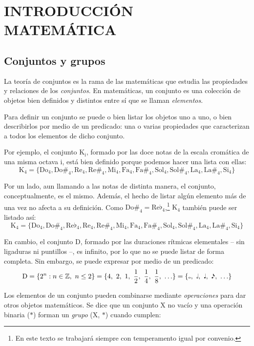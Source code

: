 \chapter{INTRODUCCIÓN MATEMÁTICA}
	\section{Conjuntos y grupos}
		La teoría de conjuntos es la rama de las matemáticas que estudia las propiedades y relaciones de los \emph{conjuntos}. En matemáticas, un conjunto es una colección de objetos bien definidos y distintos entre sí que se llaman \emph{elementos}.
	
		Para definir un conjunto se puede o bien listar los objetos uno a uno, o bien describirlos por medio de un predicado: una o varias propiedades que caracterizan a todos los elementos de dicho conjunto.

		Por ejemplo, el conjunto K$_\text{i}$, formado por las doce notas de la escala cromática de una misma octava i, está bien definido porque podemos hacer una lista con ellas:			
		$$\text{K}_\text{4} = \{\text{Do}_\text{4}, \text{Do\#}_\text{4}, \text{Re}_\text{4}, \text{Re\#}_\text{4}, \text{Mi}_\text{4}, \text{Fa}_\text{4}, \text{Fa\#}_\text{4}, \text{Sol}_\text{4}, \text{Sol\#}_\text{4}, \text{La}_\text{4}, \text{La\#}_\text{4}, \text{Si}_\text{4}\}$$
		
		Por un lado, aun llamando a las notas de distinta manera, el conjunto, conceptualmente, es el mismo. Además, el hecho de listar algún elemento más de una vez no afecta a su definición. Como $\text{Do\#}_\text{4} = \text{Re}\flat_\text{4}$,\footnote{En este texto se trabajará siempre con temperamento igual por convenio.}  $\text{K}_\text{4}$ también puede ser listado así:
		$$\text{K}_\text{4} = \{\text{Do}_\text{4}, \text{Do\#}_\text{4}, \text{Re}\flat_\text{4}, \text{Re}_\text{4}, \text{Re\#}_\text{4}, \text{Mi}_\text{4}, \text{Fa}_\text{4}, \text{Fa\#}_\text{4}, \text{Sol}_\text{4}, \text{Sol\#}_\text{4}, \text{La}_\text{4}, \text{La\#}_\text{4}, \text{Si}_\text{4}\}$$
		
		En cambio, el conjunto D, formado por las duraciones rítmicas elementales -- sin ligaduras ni puntillos --, es infinito, por lo que no se puede listar de forma completa. Sin embargo, se puede expresar por medio de un predicado:
		$$\text{D} =\{2^n:n\in\mathbb{Z},\ n\le 2\} = \{4,\ 2,\ 1,\ \frac{1}{2},\ \frac{1}{4},\ \frac{1}{8},\ \ldots\} = \{\fullnote,\ \halfnote,\ \quarternote,\ \eighthnote,\ \ldots\}$$
	
		Los elementos de un conjunto pueden combinarse mediante \emph{operaciones} para dar otros objetos matemáticos. Se dice que un conjunto X no vacío y una operación binaria ($\ast$) forman un \emph{grupo} (X, $\ast$) cuando cumplen:
	
